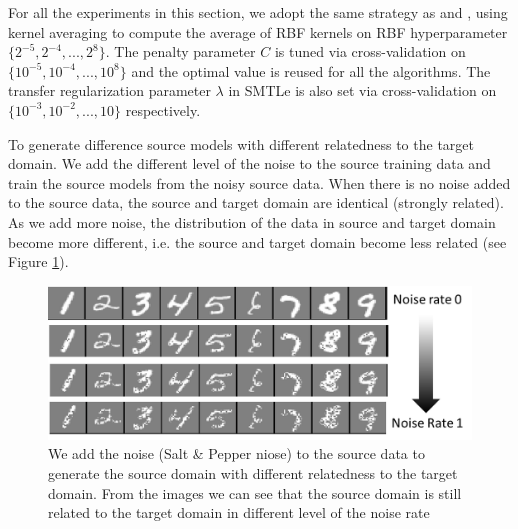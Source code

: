 For all the experiments in this section, we adopt the same strategy as \cite{kuzborskij2013n} and \cite{tommasi2014learning}, using kernel averaging \cite{gehler2009feature} to compute the average of RBF kernels on RBF hyperparameter $\{2^{-5},2^{-4},...,2^8\}$. The penalty parameter $C$ is tuned via cross-validation on $\{10^{-5},10^{-4},...,10^8\}$ and the optimal value is reused for all the algorithms.
The transfer regularization parameter $\lambda$ in SMTLe is also set via cross-validation on $\{10^{-3},10^{-2},...,10\}$ respectively.

To generate difference source models with different relatedness to the target domain. We add the different level of the noise to the source training data and train the source models from the noisy source data. When there is no noise added to the source data, the source and target domain are identical (strongly related). As we add more noise, the distribution of the data in source and target domain become more different, i.e. the source and target domain become less related (see Figure \ref{fig:noise}).

\begin{figure}
\centering
\includegraphics[scale=0.45]{fig/noise.png}
\caption{We add the noise (Salt \& Pepper niose) to the source data to generate the source domain with different relatedness to the target domain. From the images we  can see that the source domain is still related to the target domain in different level of the noise rate}\label{fig:noise}
\end{figure}

